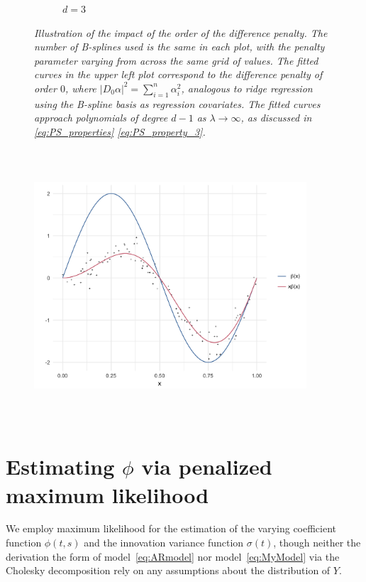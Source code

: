 \documentclass[12pt]{article}
\theoremstyle{definition}
\begin{document}
\begin{figure}[H]
\begin{subfigure}{.5\textwidth}
\caption{$d=3$}
\end{subfigure}
\caption{\textit{Illustration of the impact of the order of the difference penalty. The number of B-splines used is the same in each plot, with the penalty parameter varying from across the same grid of values. The fitted curves in the upper left plot correspond to the difference penalty of order $0$, where $\vert D_0 \alpha \vert^2 = \sum_{i=1}^n \alpha_i^2$, analogous to ridge regression using the B-spline basis as regression covariates. The fitted curves approach polynomials of degree $d-1$ as $\lambda \rightarrow \infty$, as discussed in \ref{eq:PS_properties} \ref{eq:PS_property_3}.}}
\label{fig:PS_penalty_section_figure_6}
\end{figure}

\begin{figure}[h]
\centering
 \graphicspath{{img/}}
  \includegraphics[width=4in, height=4in]{PS_penalty_section_figure_5.png}
\end{figure}

\section{Estimating $\phi$ via penalized maximum likelihood}

We employ maximum likelihood  for the estimation of  the varying coefficient function $\phi\left(t,s\right)$ and the innovation variance function $\sigma\left(t\right)$, though neither the derivation the form of model~\ref{eq:ARmodel} nor model~\ref{eq:MyModel} via the Cholesky decomposition rely on any assumptions about the distribution of $Y$. 
\end{document}
